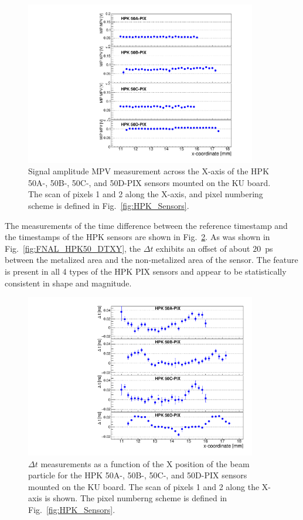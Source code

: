 \documentclass[preprint,1p]{elsarticle}
\begin{document}
\begin{figure}[htbp] 
\centering
\includegraphics[width=0.9\textwidth]{figs/KUBoard_HPK50ABCD/KUBoard_50ABCD_MPV.pdf} 
\caption{Signal amplitude MPV measurement across the X-axis of the HPK 50A-, 50B-, 50C-, and 50D-PIX sensors mounted on the KU board. The scan of pixels 1 and 2 along the X-axis, and pixel numbering scheme is defined in Fig.~\ref{fig:HPK_Sensors}.} 
\label{fig:KUBoard_50ABCD_MPV} 
\end{figure} 

The measurements of the time difference between the reference timestamp and the timestamps of the HPK sensors are shown in
Fig.~\ref{fig:KUBoard_50ABCD_MeanTime}. As was shown in
Fig.~\ref{fig:FNAL_HPK50_DTXY}, the $\Delta t$ exhibits an offset of about $20$~ps 
between the metalized area and the non-metalized area of the sensor. 
The feature is present in all 4 types of the HPK PIX sensors and appear to be 
statistically consistent in shape and magnitude. 

\begin{figure}[htbp] 
\centering
\includegraphics[width=0.9\textwidth]{figs/KUBoard_HPK50ABCD/KUBoard_50ABCD_MeanTime.pdf} 
\caption{$\Delta t$ measurements as a function of the X position of the beam particle 
for the HPK 50A-, 50B-, 50C-, and 50D-PIX sensors mounted on the KU board. The scan 
of pixels 1 and 2 along the X-axis is shown. The pixel numberng scheme is defined 
in Fig.~\ref{fig:HPK_Sensors}.} 
\label{fig:KUBoard_50ABCD_MeanTime} 
\end{figure} 
\end{document}
